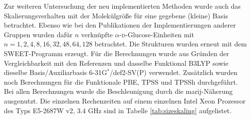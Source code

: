\bigskip
Zur weiteren Untersuchung der neu implementierten Methoden wurde auch das Skalierungsverhalten mit der Molekülgröße für eine gegebene (kleine) Basis betrachtet. Ebenso wie bei den Publikationen der Implementierungen anderer Gruppen\supercite{beer2011nuclei,kumar2016nuclei} wurden dafür $n$ verknüpfte $\alpha$-\textsc{d}-Glucose-Einheiten mit $n=1,2,4,8,16,32,48,64,128$ betrachtet. Die Strukturen wurden erneut mit dem SWEET-Programm erzeugt. Für die Berechnungen wurde aus Gründen der Vergleichbarkeit mit den Referenzen \cite{beer2011nuclei} und \cite{kumar2016nuclei} dasselbe Funktional B3LYP\supercite{becke1993density,lee1988development,stephens1994ab} sowie dieselbe Basis/Auxiliarbasis 6-31G$^*$\supercite{hariharan1973influence}/def2-SV(P)\supercite{eichkorn1995auxiliary} verwendet. Zusätzlich wurden noch Berechnungen für die Funktionale PBE, TPSS und TPSSh durchgeführt. Bei allen Berechnungen wurde die Beschleunigung durch die \ac{marij}-Näherung ausgenutzt. Die einzelnen Rechenzeiten auf einem einzelnen Intel\textsuperscript{\textregistered} Xeon\textsuperscript{\textregistered} Prozessor des Typs E5-2687W v2, 3.4 GHz sind in Tabelle \ref{tab:sizeskaling} aufgelistet. 

